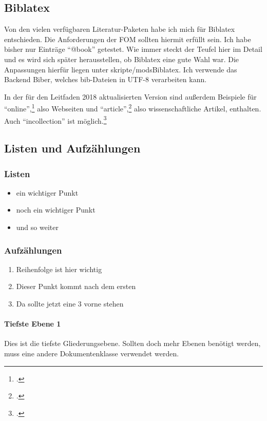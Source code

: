 
\subsection{Biblatex}
Von den vielen verfügbaren Literatur-Paketen habe ich mich für Biblatex entschieden. Die Anforderungen der FOM sollten hiermit erfüllt sein. Ich habe bisher nur Einträge \enquote{@book} getestet. Wie immer steckt der Teufel hier im Detail und es wird sich später herausstellen, ob Biblatex eine gute Wahl war. Die Anpassungen hierfür liegen unter skripte/modsBiblatex. Ich verwende das Backend Biber, welches bib-Dateien in UTF-8 verarbeiten kann.

In der für den Leitfaden 2018 aktualisierten Version sind außerdem Beispiele für \enquote{online},\footcite[Vgl. ][]{website:angular:aboutAngular} also Webseiten und \enquote{article},\footcite[Vgl. ][S. 140]{Decker2009} also wissenschaftliche Artikel, enthalten. Auch \enquote{incollection} ist möglich.\footcite{becker2016data}

\subsection{Listen und Aufzählungen}
\subsubsection{Listen}
\begin{itemize}
\item ein wichtiger Punkt
\item noch ein wichtiger Punkt
\item und so weiter
\end{itemize}
\subsubsection{Aufzählungen}
\begin{enumerate}
\item Reihenfolge ist hier wichtig
\item Dieser Punkt kommt nach dem ersten
\item Da sollte jetzt eine 3 vorne stehen
\end{enumerate}

\paragraph{Tiefste Ebene 1}
Dies ist die tiefste Gliederungsebene. Sollten doch mehr Ebenen benötigt werden, muss eine andere Dokumentenklasse verwendet werden.

